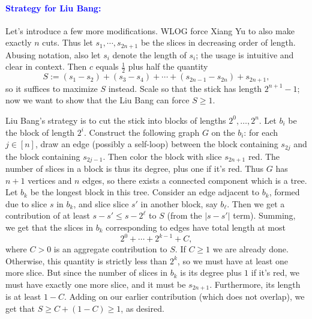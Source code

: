 \documentclass[11pt]{article}
\begin{document}
\paragraph{\textcolor{blue}{Strategy for Liu Bang:}} Let's introduce a few more modifications. WLOG force Xiang Yu to also make exactly $n$ cuts. Thus let $s_1,\cdots,s_{2n+1}$ be the slices in decreasing order of length. Abusing notation, also let $s_i$ denote the length of $s_i$; the usage is intuitive and clear in context. Then $c$ equals $\frac{1}{2}$ plus half the quantity
$$S:=(s_1-s_2)+(s_3-s_4)+\cdots+(s_{2n-1}-s_{2n})+s_{2n+1},$$so it suffices to maximize $S$ instead. Scale so that the stick has length $2^{n+1}-1$; now we want to show that the Liu Bang can force $S \geq 1$.

\medskip
Liu Bang's strategy is to cut the stick into blocks of lengths $2^0,\ldots,2^n$. Let $b_i$ be the block of length $2^i$. Construct the following graph $G$ on the $b_i$: for each $j \in [n]$, draw an edge (possibly a self-loop) between the block containing $s_{2j}$ and the block containing $s_{2j-1}$. Then color the block with slice $s_{2n+1}$ red. The number of slices in a block is thus its degree, plus one if it's red. Thus $G$ has $n+1$ vertices and $n$ edges, so there exists a connected component which is a tree. Let $b_k$ be the longest block in this tree. Consider an edge adjacent to $b_k$, formed due to slice $s$ in $b_k$, and slice slice $s'$ in another block, say $b_\ell$. Then we get a contribution of at least $s-s' \leq s-2^{\ell}$ to $S$ (from the $|s-s'|$ term). Summing, we get that the slices in $b_k$ corresponding to edges have total length at most
$$2^0+\cdots+2^{k-1}+C,$$where $C>0$ is an aggregate contribution to $S$. If $C \geq 1$ we are already done. Otherwise, this quantity is strictly less than $2^k$, so we must have at least one more slice. But since the number of slices in $b_k$ is its degree plus $1$ if it's red, we must have exactly one more slice, and it must be $s_{2n+1}$. Furthermore, its length is at least $1-C$. Adding on our earlier contribution (which does not overlap), we get that $S \geq C+(1-C) \geq 1$, as desired. 

\newpage
\end{document}
